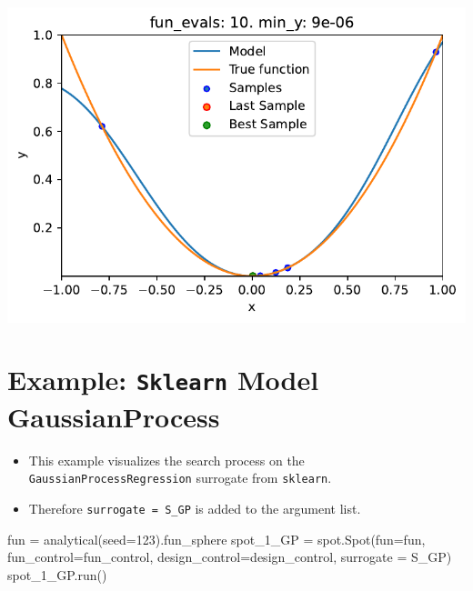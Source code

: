 \documentclass[
  letterpaper,
  DIV=11,
  numbers=noendperiod]{scrreprt}
\newenvironment{Shaded}{\begin{snugshade}}{\end{snugshade}}
\newcommand{\DecValTok}[1]{\textcolor[rgb]{0.68,0.00,0.00}{#1}}
\newcommand{\NormalTok}[1]{\textcolor[rgb]{0.00,0.23,0.31}{#1}}
\newcommand{\OperatorTok}[1]{\textcolor[rgb]{0.37,0.37,0.37}{#1}}
\providecommand{\tightlist}{%
  \setlength{\itemsep}{0pt}\setlength{\parskip}{0pt}}\usepackage{longtable,booktabs,array}
\begin{document}
\includegraphics{010_num_spot_sklearn_surrogate_files/figure-pdf/cell-23-output-1.pdf}

\section{\texorpdfstring{Example: \texttt{Sklearn} Model
GaussianProcess}{Example: Sklearn Model GaussianProcess}}\label{example-sklearn-model-gaussianprocess}

\begin{itemize}
\tightlist
\item
  This example visualizes the search process on the
  \texttt{GaussianProcessRegression} surrogate from \texttt{sklearn}.
\item
  Therefore \texttt{surrogate\ =\ S\_GP} is added to the argument list.
\end{itemize}

\begin{Shaded}
\begin{Highlighting}[]
\NormalTok{fun }\OperatorTok{=}\NormalTok{ analytical(seed}\OperatorTok{=}\DecValTok{123}\NormalTok{).fun\_sphere}
\NormalTok{spot\_1\_GP }\OperatorTok{=}\NormalTok{ spot.Spot(fun}\OperatorTok{=}\NormalTok{fun,}
\NormalTok{                      fun\_control}\OperatorTok{=}\NormalTok{fun\_control,}
\NormalTok{                      design\_control}\OperatorTok{=}\NormalTok{design\_control,}
\NormalTok{                      surrogate }\OperatorTok{=}\NormalTok{ S\_GP)}
\NormalTok{spot\_1\_GP.run()}
\end{Highlighting}
\end{Shaded}
\end{document}

